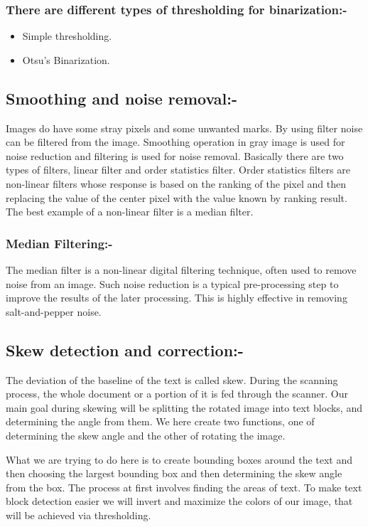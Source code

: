 \subsubsection{There are different types of thresholding for binarization:-}
\begin{itemize}
\item Simple thresholding.
\item Otsu's Binarization.
\end{itemize}

\subsection{Smoothing and noise removal:-}
Images do have some stray pixels and some unwanted marks. By using filter noise can be filtered from the image. Smoothing operation in gray image is used for noise reduction and filtering is used for noise removal. Basically there are two types of filters, linear filter and order statistics filter. Order statistics filters are non-linear filters whose response is based on the ranking of the pixel and then replacing the value of the center pixel with the value known by ranking result. The best example of a non-linear filter is a median filter.

\subsubsection{Median Filtering:-}
The median filter is a non-linear digital filtering technique, often used to remove noise from an image. Such noise reduction is a typical pre-processing step to improve the results of the later processing. This is highly effective in removing salt-and-pepper noise.

\subsection{Skew detection and correction:-}
The deviation of the baseline of the text is called skew. During the scanning process, the whole document or a portion of it is fed through the scanner. Our main goal during skewing will be splitting the rotated image into text blocks, and determining the angle from them. We here create two functions, one of determining the skew angle and the other of rotating the image.

What we are trying to do here is to create bounding boxes around the text and then choosing the largest bounding box and then determining the skew angle from the box. The process at first involves finding the areas of text. To make text block detection easier we will invert and maximize the colors of our image, that will be achieved via thresholding. 

